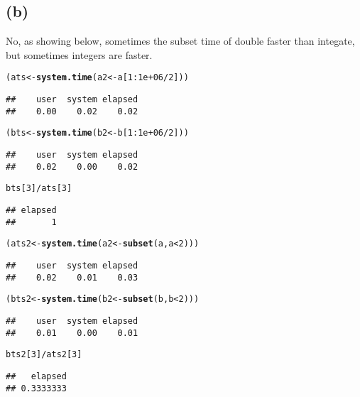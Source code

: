 \documentclass{article}\usepackage[]{graphicx}\usepackage[]{color}
\makeatletter
\newcommand{\hlnum}[1]{\textcolor[rgb]{0.686,0.059,0.569}{#1}}%
\newcommand{\hlopt}[1]{\textcolor[rgb]{0,0,0}{#1}}%
\newcommand{\hlstd}[1]{\textcolor[rgb]{0.345,0.345,0.345}{#1}}%
\newcommand{\hlkwb}[1]{\textcolor[rgb]{0.69,0.353,0.396}{#1}}%
\newcommand{\hlkwd}[1]{\textcolor[rgb]{0.737,0.353,0.396}{\textbf{#1}}}%
\newenvironment{kframe}{%
 \def\at@end@of@kframe{}%
 \ifinner\ifhmode%
  \def\at@end@of@kframe{\end{minipage}}%
  \begin{minipage}{\columnwidth}%
 \fi\fi%
 \def\FrameCommand##1{\hskip\@totalleftmargin \hskip-\fboxsep
 \colorbox{shadecolor}{##1}\hskip-\fboxsep
     \hskip-\linewidth \hskip-\@totalleftmargin \hskip\columnwidth}%
 \MakeFramed {\advance\hsize-\width
   \@totalleftmargin\z@ \linewidth\hsize
   \@setminipage}}%
 {\par\unskip\endMakeFramed%
 \at@end@of@kframe}
\newenvironment{knitrout}{}{} %
\makeatother
\begin{document}
\subsection{(b)}
No, as showing below, sometimes the subset time of double faster than integate, but sometimes integers are faster.\\
\begin{knitrout}
\color{fgcolor}\begin{kframe}
\begin{alltt}
\hlstd{(ats} \hlkwb{<-} \hlkwd{system.time}\hlstd{(a2} \hlkwb{<-} \hlstd{a[}\hlnum{1}\hlopt{:}\hlnum{1e+06}\hlopt{/}\hlnum{2}\hlstd{]))}
\end{alltt}
\begin{verbatim}
##    user  system elapsed 
##    0.00    0.02    0.02
\end{verbatim}
\begin{alltt}
\hlstd{(bts} \hlkwb{<-} \hlkwd{system.time}\hlstd{(b2} \hlkwb{<-} \hlstd{b[}\hlnum{1}\hlopt{:}\hlnum{1e+06}\hlopt{/}\hlnum{2}\hlstd{]))}
\end{alltt}
\begin{verbatim}
##    user  system elapsed 
##    0.02    0.00    0.02
\end{verbatim}
\begin{alltt}
\hlstd{bts[}\hlnum{3}\hlstd{]}\hlopt{/}\hlstd{ats[}\hlnum{3}\hlstd{]}
\end{alltt}
\begin{verbatim}
## elapsed 
##       1
\end{verbatim}
\begin{alltt}
\hlstd{(ats2} \hlkwb{<-} \hlkwd{system.time}\hlstd{(a2} \hlkwb{<-} \hlkwd{subset}\hlstd{(a, a} \hlopt{<} \hlnum{2}\hlstd{)))}
\end{alltt}
\begin{verbatim}
##    user  system elapsed 
##    0.02    0.01    0.03
\end{verbatim}
\begin{alltt}
\hlstd{(bts2} \hlkwb{<-} \hlkwd{system.time}\hlstd{(b2} \hlkwb{<-} \hlkwd{subset}\hlstd{(b, b} \hlopt{<} \hlnum{2}\hlstd{)))}
\end{alltt}
\begin{verbatim}
##    user  system elapsed 
##    0.01    0.00    0.01
\end{verbatim}
\begin{alltt}
\hlstd{bts2[}\hlnum{3}\hlstd{]}\hlopt{/}\hlstd{ats2[}\hlnum{3}\hlstd{]}
\end{alltt}
\begin{verbatim}
##   elapsed 
## 0.3333333
\end{verbatim}
\end{kframe}
\end{knitrout}
\end{document}
